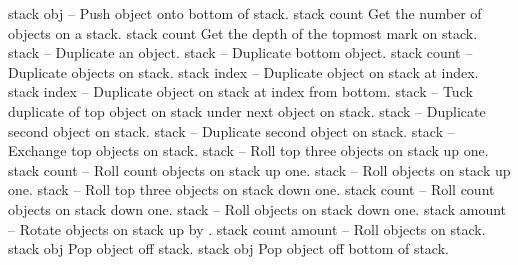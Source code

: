 \begin{longtable}{}
\hline
\optableent
	{stack obj}
	{{\bf {}}}
	{--}
	{Push object onto bottom of stack.}
\hline
\optableent
	{stack}
	{{\bf {}}}
	{count}
	{Get the number of objects on a stack.}
\hline
\optableent
	{stack}
	{{\bf {}}}
	{count}
	{Get the depth of the topmost mark on stack.}
\hline
\optableent
	{stack}
	{{\bf {}}}
	{--}
	{Duplicate an object.}
\hline
\optableent
	{stack}
	{{\bf {}}}
	{--}
	{Duplicate bottom object.}
\hline
\optableent
	{stack count}
	{{\bf {}}}
	{--}
	{Duplicate objects on stack.}
\hline
\optableent
	{stack index}
	{{\bf {}}}
	{--}
	{Duplicate object on stack at index.}
\hline
\optableent
	{stack index}
	{{\bf {}}}
	{--}
	{Duplicate object on stack at index from bottom.}
\hline
\optableent
	{stack}
	{{\bf {}}}
	{--}
	{Tuck duplicate of top object on stack under next object on stack.}
\hline
\optableent
	{stack}
	{{\bf {}}}
	{--}
	{Duplicate second object on stack.}
\hline
\optableent
	{stack}
	{{\bf {}}}
	{--}
	{Duplicate second object on stack.}
\hline
\optableent
	{stack}
	{{\bf {}}}
	{--}
	{Exchange top objects on stack.}
\hline
\optableent
	{stack}
	{{\bf {}}}
	{--}
	{Roll top three objects on stack up one.}
\hline
\optableent
	{stack count}
	{{\bf {}}}
	{--}
	{Roll count objects on stack up one.}
\hline
\optableent
	{stack}
	{{\bf {}}}
	{--}
	{Roll objects on stack up one.}
\hline
\optableent
	{stack}
	{{\bf {}}}
	{--}
	{Roll top three objects on stack down one.}
\hline
\optableent
	{stack count}
	{{\bf {}}}
	{--}
	{Roll count objects on stack down one.}
\hline
\optableent
	{stack}
	{{\bf {}}}
	{--}
	{Roll objects on stack down one.}
\hline
\optableent
	{stack amount}
	{{\bf {}}}
	{--}
	{Rotate objects on stack up by .}
\hline
\optableent
	{stack count amount}
	{{\bf {}}}
	{--}
	{Roll objects on stack.}
\hline
\optableent
	{stack}
	{{\bf {}}}
	{obj}
	{Pop object off stack.}
\hline
\optableent
	{stack}
	{{\bf {}}}
	{obj}
	{Pop object off bottom of stack.}

\end{longtable}
